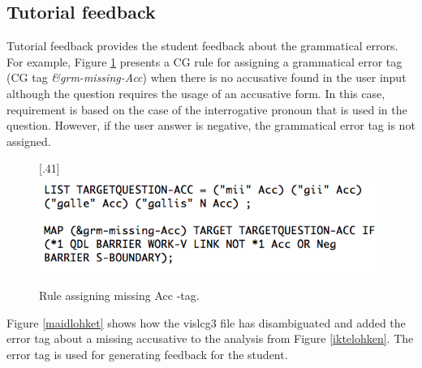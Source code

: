 \documentclass[11pt]{article}
\begin{document}
\subsection{Tutorial feedback} \label{tutorial}


Tutorial feedback provides the student feedback about the grammatical errors. For example, Figure \ref{cg3} presents a CG rule for assigning a grammatical error tag (CG tag \textit{\&grm-missing-Acc}) when there is no accusative found in the user input although the question requires the usage of an accusative form. In this case, requirement is based on the case of the interrogative pronoun that is used in the question. However, if the user answer is negative, the grammatical error tag is not assigned.

\begin{figure}[htbp]
\begin{center}
\scalebox{.41}[.41]{\includegraphics{presentation/img/pedcg3ny.png}}
\caption{Rule assigning missing Acc -tag.}
\label{cg3}
\end{center}
\end{figure}

Figure \ref{maidlohket} shows how the vislcg3 file has disambiguated and added the error tag about a missing accusative to the analysis from Figure \ref{iktelohken}. The error tag is used for generating feedback for the student. 
\end{document}
